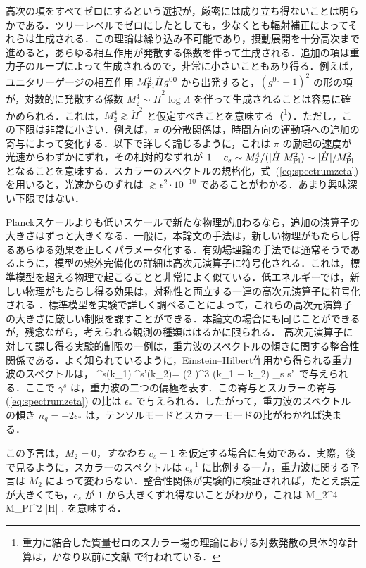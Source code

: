 高次の項をすべてゼロにするという選択が，厳密には成り立ち得ないことは明らかである．ツリーレベルでゼロにしたとしても，少なくとも輻射補正によってそれらは生成される．この理論は繰り込み不可能であり，摂動展開を十分高次まで進めると，あらゆる相互作用が発散する係数を伴って生成される．追加の項は重力子のループによって生成されるので，非常に小さいこともあり得る．例えば，ユニタリーゲージの相互作用 $M_{\rm Pl}^2 \dot H g^{00}$ から出発すると，$(g^{00}+1)^2$ の形の項が，対数的に発散する係数 $M_2^4 \sim \dot H^2 \log
\Lambda$ を伴って生成されることは容易に確かめられる．これは，$M^4_2 \gtrsim \dot H^2$ と仮定すべきことを意味する（\footnote{重力に結合した質量ゼロのスカラー場の理論における対数発散の具体的な計算は，かなり以前に文献 \cite{tHooft:1974toh} で行われている．}）．ただし，この下限は非常に小さい．例えば，$\pi$ の分散関係は，時間方向の運動項への追加の寄与によって変化する．以下で詳しく論じるように，これは $\pi$ の励起の速度が光速からわずかにずれ，その相対的なずれが $1-c_s \sim M_2^4/(|\dot H| M_{\rm Pl}^2) \sim |\dot H|/M_{\rm Pl}^2$ となることを意味する．スカラーのスペクトルの規格化，式~(\ref{eq:spectrumzeta}) を用いると，光速からのずれは $\gtrsim \epsilon^2 \cdot 10^{-10}$ であることがわかる．あまり興味深い下限ではない．

Planckスケールよりも低いスケールで新たな物理が加わるなら，追加の演算子の大きさはずっと大きくなる．一般に，本論文の手法は，新しい物理がもたらし得るあらゆる効果を正しくパラメータ化する．有効場理論の手法では通常そうであるように，模型の紫外完備化の詳細は高次元演算子に符号化される．これは，標準模型を超える物理で起こることと非常によく似ている．低エネルギーでは，新しい物理がもたらし得る効果は，対称性と両立する一連の高次元演算子に符号化される \cite{Barbieri:2004qk}．標準模型を実験で詳しく調べることによって，これらの高次元演算子の大きさに厳しい制限を課すことができる．本論文の場合にも同じことができるが，残念ながら，考えられる観測の種類ははるかに限られる．
高次元演算子に対して課し得る実験的制限の一例は，重力波のスペクトルの傾きに関する整合性関係である．よく知られているように，Einstein--Hilbert作用から得られる重力波のスペクトルは，
\be
\label{eq:GWspectrum}
\langle \gamma^s(\vec k_1) \gamma^{s'}(\vec k_2)\rangle = (2 \pi)^3
\delta(\vec k_1 + \vec k_2) 
\delta_{s s'}\,
\ee
で与えられる．ここで $\gamma^s$ は，重力波の二つの偏極を表す．この寄与とスカラーの寄与 (\ref{eq:spectrumzeta}) の比は $\epsilon_*$ で与えられる．したがって，重力波のスペクトルの傾き $n_g=-2 \epsilon_*$ は，テンソルモードとスカラーモードの比がわかれば決まる．

この予言は，$M_2 =0$，{\em すなわち} $c_s=1$ を仮定する場合に有効である．実際，後で見るように，スカラーのスペクトルは $c_s^{-1}$ に比例する一方，重力波に関する予言は $M_2$ によって変わらない．整合性関係が実験的に検証されれば，たとえ誤差が大きくても，$c_s$ が $1$ から大きくずれ得ないことがわかり，これは
\be
M_2^4 \lesssim M_{\rm Pl}^2 |\dot H| \;.
\ee
を意味する．

